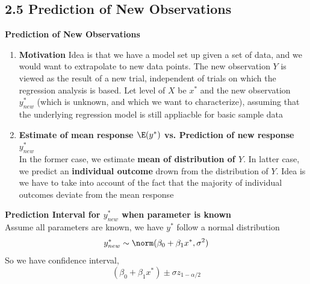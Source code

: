 \documentclass[11pt]{article}
\begin{document}
\subsection*{2.5 Prediction of New Observations}

\begin{defn*} \textbf{Prediction of New Observations}
    \begin{enumerate}
        \item \textbf{Motivation}  Idea is that we have a model set up given a set of data, and we would want to extrapolate to new data points. The new observation $Y$ is viewed as the result of a new trial, independent of trials on which the regression analysis is based. Let level of $X$ be $x^*$ and the new observation $y^*_{new}$ (which is unknown, and which we want to characterize), assuming that the underlying regression model is still appliacble for basic sample data 
        \item \textbf{Estimate of mean response $\E(y^*)$ vs. Prediction of new response $y^*_{new}$ } \\
        In the former case, we estimate \textbf{mean of distribution of $Y$}. In latter case, we predict an \textbf{individual outcome} drown from the distribution of $Y$. Idea is we have to take into account of the fact that the majority of individual outcomes deviate from the mean response
    \end{enumerate}
\end{defn*}


\begin{defn*}
    \textbf{Prediction Interval for $y^*_{new}$ when parameter is known} \\
    Assume all parameters are known, we have $y^*$ follow a normal distribution 
    \[
        y^*_{new} \sim \norm(\beta_0 + \beta_1 x^*, \sigma^2)
    \]
    So we have confidence interval, 
    \[
        \left( \beta_0 + \beta_1 x^* \right) \pm \sigma z_{1-\alpha/2} 
    \]
\end{defn*}
\end{document}
